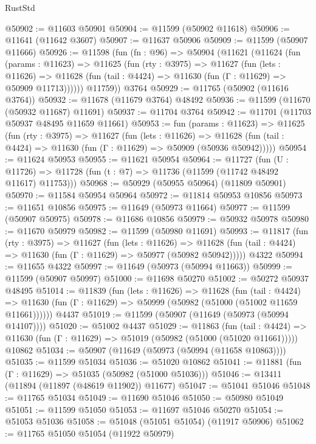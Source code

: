 \begin{lexlean}{RustStd}
\begin{coremodule}
@50902 := @11603 @50901
@50904 := @11599 (@50902 @11618)
@50906 := @11641 (@11642 @3607)
@50907 := @11637 @50906
@50909 := @11599 (@50907 @11666)
@50926 := @11598
    (fun (fn : @96) =>
    @50904
      (@11621
        (@11624
          (fun (params : @11623) =>
          @11625
            (fun (rty : @3975) =>
            @11627
              (fun (lets : @11626) =>
              @11628 (fun (tail : @4424) => @11630 (fun (Γ : @11629) => @50909 @11713))))))
        @11759))
    @3764
@50929 := @11765 (@50902 (@11616 @3764))
@50932 := @11678 (@11679 @3764) @48492
@50936 := @11599 (@11670 (@50932 @11687) @11691)
@50937 := @11704 @3764
@50942 := @11701 (@11703 @50937 @48495 @11659 @11661)
@50953 := fun (params : @11623) =>
  @11625
    (fun (rty : @3975) =>
    @11627
      (fun (lets : @11626) =>
      @11628 (fun (tail : @4424) => @11630 (fun (Γ : @11629) => @50909 (@50936 @50942)))))
@50954 := @11624 @50953
@50955 := @11621 @50954
@50964 := @11727
    (fun (U : @11726) => @11728 (fun (t : @7) => @11736 (@11599 (@11742 @48492 @11617) @11753)))
@50968 := @50929 (@50955 @50964) (@11809 @50901)
@50970 := @11584 @50954 @50964
@50972 := @11814 @50953 @10856
@50973 := @11651 @10856
@50975 := @11649 (@50973 @11664)
@50977 := @11599 (@50907 @50975)
@50978 := @11686 @10856
@50979 := @50932 @50978
@50980 := @11670 @50979
@50982 := @11599 (@50980 @11691)
@50993 := @11817
    (fun (rty : @3975) =>
    @11627
      (fun (lets : @11626) =>
      @11628 (fun (tail : @4424) => @11630 (fun (Γ : @11629) => @50977 (@50982 @50942)))))
    @4322
@50994 := @11655 @4322
@50997 := @11649 (@50973 (@50994 @11663))
@50999 := @11599 (@50907 @50997)
@51000 := @11698 @50270
@51002 := @50272 @50937 @48495
@51014 := @11839
    (fun (lets : @11626) =>
    @11628
      (fun (tail : @4424) =>
      @11630 (fun (Γ : @11629) => @50999 (@50982 (@51000 (@51002 @11659 @11661))))))
    @4437
@51019 := @11599 (@50907 (@11649 (@50973 (@50994 @14107))))
@51020 := @51002 @4437
@51029 := @11863
    (fun (tail : @4424) => @11630 (fun (Γ : @11629) => @51019 (@50982 (@51000 (@51020 @11661)))))
    @10862
@51034 := @50907 (@11649 (@50973 (@50994 (@11658 @10863))))
@51035 := @11599 @51034
@51036 := @51020 @10862
@51041 := @11881 (fun (Γ : @11629) => @51035 (@50982 (@51000 @51036)))
@51046 := @13411 (@11894 (@11897 (@48619 @11902)) @11677)
@51047 := @51041 @51046
@51048 := @11765 @51034
@51049 := @11690 @51046
@51050 := @50980 @51049
@51051 := @11599 @51050
@51053 := @11697 @51046 @50270
@51054 := @51053 @51036
@51058 := @51048 (@51051 @51054) (@11917 @50906)
@51062 := @11765 @51050 @51054 (@11922 @50979)

\end{coremodule}
\end{lexlean}
